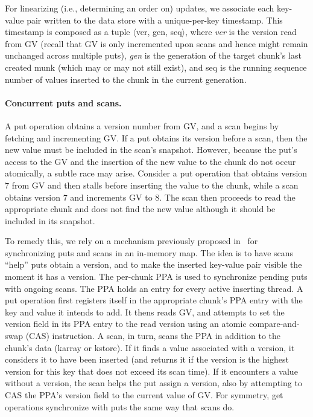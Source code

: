 For linearizing (i.e., determining an order on) updates, we associate each key-value pair written to the data store 
with a unique-per-key timestamp.
This timestamp is composed as a tuple $\langle$ver, gen, seq$\rangle$, where \emph{ver} is  the version read from GV 
(recall that GV is only incremented upon scans and hence might remain unchanged across multiple puts),
\emph{gen} is the generation of the target chunk's last created munk  (which may or may not still exist), 
and seq is the running sequence number of values inserted to the chunk in the current generation.

\paragraph{Concurrent puts and scans.}

A put operation obtains a version number from GV, and a scan begins by fetching and incrementing GV.
If a put obtains its version before a scan, then the new value must be included in the scan's snapshot. 
However, because the put's access to the GV and the insertion of the new value to the chunk do not occur atomically,
a subtle race may arise. Consider a put operation that obtains version $7$ from GV and then stalls before
inserting the value to the chunk, while a scan obtains version $7$ and increments GV to $8$. The scan then proceeds 
to read the appropriate chunk and does not find the new value although it should be included in its snapshot.

To remedy this, we rely on a mechanism previously proposed in~\cite{kiwi} for synchronizing puts and scans in an in-memory map.  
The idea is to have scans ``help'' puts obtain a version, and to make the inserted key-value pair visible the moment it has a version.
The per-chunk PPA is used to synchronize pending puts  with ongoing scans. 
The PPA holds an entry for every active inserting thread.
A put operation first registers itself in the appropriate chunk's PPA entry with the key and value it intends to add.
It thens reads GV, and attempts to set the version field in its PPA entry to the read version using an atomic 
compare-and-swap (CAS) instruction. A scan, in turn, scans the PPA in addition to the chunk's data (karray 
or kstore). If it finds a value associated with a version, it considers it to have been inserted (and returns it if the version is
the highest version for this key that does not exceed its scan time). If it encounters a value without a version, the scan helps the put
assign a version, also by attempting to CAS the PPA's version field to the current value of GV.
For symmetry, get operations synchronize with puts the same way that scans do. 


